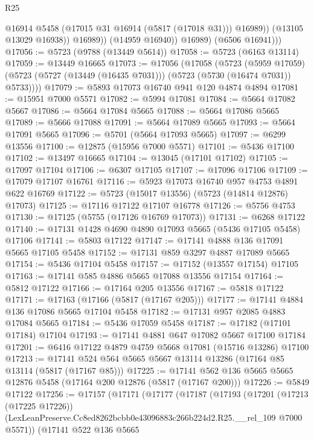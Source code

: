 \begin{lexlean}{R25}
\begin{coremodule}
                      @16914
                      @5458
                      (@17015 @31 @16914 (@5817 (@17018 @31)))
                      @16989))
                  (@13105 @13029 @16938))
                @16989))
            (@14959 @16940))
          @16989)
        (@6506 @16941)))
@17056 := @5723 (@9788 (@13449 @5614))
@17058 := @5723 (@6163 @13114)
@17059 := @13449 @16665
@17073 := @17056
    (@17058
      (@5723
        (@5959 @17059)
        (@5723 (@5727 (@13449 (@16435 @7031))) (@5723 (@5730 (@16474 @7031)) @5733))))
@17079 := @5893 @17073 @16740 @941 @120 @4874 @4894
@17081 := @15951 @7000 @5571
@17082 := @5994 @17081
@17084 := @5664 @17082 @5667
@17086 := @5664 @17084 @5665
@17088 := @5664 @17086 @5665
@17089 := @5666 @17088
@17091 := @5664 @17089 @5665
@17093 := @5664 @17091 @5665
@17096 := @5701 (@5664 @17093 @5665)
@17097 := @6299 @13556
@17100 := @12875 (@15956 @7000 @5571)
@17101 := @5436 @17100
@17102 := @13497 @16665
@17104 := @13045 (@17101 @17102)
@17105 := @17097 @17104
@17106 := @6307 @17105
@17107 := @17096 @17106
@17109 := @17079 @17107 @16761
@17116 := @5923 @17073 @16740 @957 @4753 @4891 @622 @16769
@17122 := @5723 (@15017 @13556) (@5723 (@14814 @12876) @17073)
@17125 := @17116 @17122 @17107 @16778
@17126 := @5756 @4753
@17130 := @17125 (@5755 (@17126 @16769 @17073))
@17131 := @6268 @17122
@17140 := @17131 @1428 @4690 @4890 @17093 @5665 (@5436 @17105 @5458) @17106
@17141 := @5803 @17122
@17147 := @17141 @4888 @136 @17091 @5665 @17105 @5458
@17152 := @17131 @859 @3297 @4887 @17089 @5665
@17154 := @5436 @17104 @5458
@17157 := @17152 (@13557 @17154) @17105
@17163 := @17141 @585 @4886 @5665 @17088 @13556 @17154
@17164 := @5812 @17122
@17166 := @17164 @205 @13556
@17167 := @5818 @17122
@17171 := @17163 (@17166 (@5817 (@17167 @205)))
@17177 := @17141 @4884 @136 @17086 @5665 @17104 @5458
@17182 := @17131 @957 @2085 @4883 @17084 @5665
@17184 := @5436 @17059 @5458
@17187 := @17182 (@17101 @17184) @17104
@17193 := @17141 @4881 @647 @17082 @5667 @17100 @17184
@17201 := @6416 @17122 @4879 @4759 @5668 @17081 (@15716 @13286) @17100
@17213 := @17141 @524 @564 @5665 @5667 @13114 @13286 (@17164 @85 @13114 (@5817 (@17167 @85)))
@17225 := @17141 @562 @136 @5665 @5665 @12876 @5458 (@17164 @200 @12876 (@5817 (@17167 @200)))
@17226 := @5849 @17122
@17256 := @17157
    (@17171
      (@17177
        (@17187
          (@17193
            (@17201
              (@17213 (@17225 @17226))
              (LexLeanPreserve.Cc8ed8262bcbb0e43096883c266b224d2.R25.__rel_109 @7000 @5571))
            (@17141
              @522
              @136
              @5665

\end{coremodule}
\end{lexlean}
